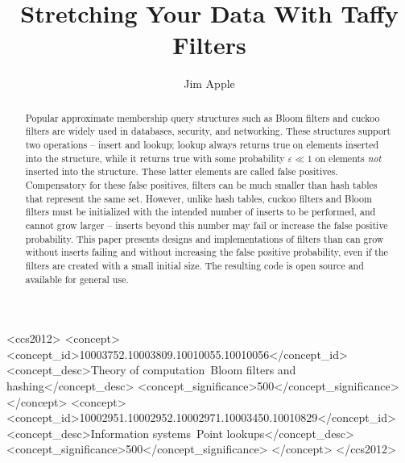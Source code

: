 \documentclass[sigconf, nonacm]{acmart}
\begin{document}
\title{Stretching Your Data With Taffy Filters}
\author{Jim Apple}

\begin{abstract}
\end{abstract}

\begin{CCSXML}
<ccs2012>
   <concept>
       <concept_id>10003752.10003809.10010055.10010056</concept_id>
       <concept_desc>Theory of computation~Bloom filters and hashing</concept_desc>
       <concept_significance>500</concept_significance>
   </concept>
   <concept>
       <concept_id>10002951.10002952.10002971.10003450.10010829</concept_id>
       <concept_desc>Information systems~Point lookups</concept_desc>
       <concept_significance>500</concept_significance>
   </concept>
 </ccs2012>
\end{CCSXML}






\begin{abstract}
Popular approximate membership query structures such as Bloom filters and cuckoo filters are widely used in databases, security, and networking.
These structures support two operations -- insert and lookup; lookup always returns true on elements inserted into the structure, while it returns true with some probability $\varepsilon \ll 1$ on elements {\em not} inserted into the structure.
These latter elements are called false positives.
Compensatory for these false positives, filters can be much smaller than hash tables that represent the same set.
However, unlike hash tables, cuckoo filters and Bloom filters must be initialized with the intended number of inserts to be performed, and cannot grow larger --
inserts beyond this number may fail or increase the false positive probability.
This paper presents designs and implementations of filters than can grow without inserts failing and without increasing the false positive probability, even if the filters are created with a small initial size.
The resulting code is open source and available for general use.
\end{abstract}
\end{document}
